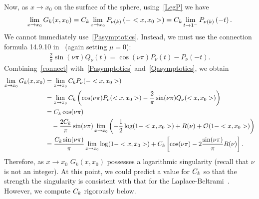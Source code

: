 Now, as $x\rightarrow x_{0}$ on the surface of the sphere,
using~\eqref{LegP} we have 
\begin{align*}
  \lim_{x\rightarrow x_{0}}G_k(x,x_{0}) =
  C_k\lim_{x\rightarrow x_{0}} P_{\nu(k)}\left(-<x,x_{0}>\right) =
  C_k\lim_{t\rightarrow 1^-}P_{\nu(k)}\left(-t\right).
\end{align*}
We cannot immediately use~\eqref{Pasymptotics}. Instead, we must use the
connection formula 14.9.10 in~\cite{fatAbramowitz} (again setting
$\mu=0$):
\begin{align}
  \frac{2}{\pi}\sin(\nu \pi)Q_\nu(t)= \cos(\nu\pi)P_\nu(t) - P_\nu(-t).
  \label{connect}
\end{align}
Combining~\eqref{connect} with~\eqref{Pasymptotics}
and~\eqref{Qasymptotics}, we obtain
\begin{align*}
  \lim_{x\rightarrow x_{0}}G_k(x,x_{0}) &= \lim_{x\rightarrow x_{0}}
      C_k P_{\nu}(-<x,x_{0}>) \nonumber \\
  &= \lim_{x\rightarrow x_{0} }C_k\left(\cos(\nu\pi)
  P_{\nu}(<x,x_{0}>) - 
      \frac{2}{\pi}\sin(\nu \pi)Q_{\nu}(<x,x_0>)\right) \nonumber \\
  &= C_k\cos(\nu\pi) \nonumber \\
  & \quad - \frac{2C_k}{\pi}\sin(\nu\pi)\lim_{x\rightarrow x_0} 
      \left(-\frac{1}{2}\log(1-<x,x_0>) + R(\nu) +
      \mathcal{O}(1-<x,x_0>)\right) \nonumber \\
  &=\frac{C_k\sin(\nu\pi)}{\pi}\lim_{x\rightarrow x_0}
      \log(1-<x,x_0>) + C_k\left[\cos(\nu\pi)-
      2\frac{\sin(\nu\pi)}{\pi}R(\nu)\right].
\end{align*}
Therefore, as $x\rightarrow x_{0}$ $G_k(x,x_{0})$ possesses a
logarithmic singularity (recall that $\nu$ is not an integer).  At this
point, we could predict a value for $C_k$ so that the strength the
singularity is consistent with that for the
Laplace-Beltrami~\cite{gemmrich}.  However, we compute $C_k$ rigorously
below.

